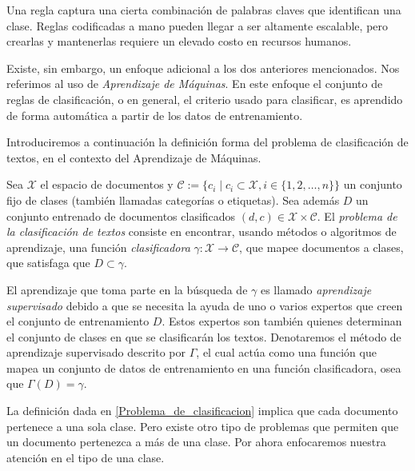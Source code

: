 \documentclass{llncs}
\begin{document}
	Una regla captura una cierta combinaci\'on de palabras claves que identifican una clase. Reglas codificadas a mano pueden llegar a ser altamente escalable, pero crearlas y mantenerlas requiere un elevado costo en recursos humanos.
	
	Existe, sin embargo, un enfoque adicional a los dos anteriores mencionados. Nos referimos al uso de \emph{Aprendizaje de M\'aquinas}. En este enfoque el conjunto de reglas de clasificaci\'on, o en general, el criterio usado para clasificar, es aprendido de forma autom\'atica a partir de los datos de entrenamiento.
	
	Introduciremos a continuaci\'on la definici\'on forma del problema de clasificaci\'on de textos, en el contexto del Aprendizaje de M\'aquinas.
	
	\begin{definition} \label{Problema_de_clasificacion}
		Sea $\mathcal{{X}}$ el espacio de documentos y $\mathcal{C} := \{c_i \mid c_i \subset \mathcal{X}, i \in \{ 1,2,\dots,n\} \}$ un conjunto fijo de clases (tambi\'en llamadas categor\'ias o etiquetas). Sea adem\'as $D$ un conjunto entrenado de documentos clasificados $(d,c) \in \mathcal X \times \mathcal{C}$. El \emph{problema de la clasificaci\'on de textos} consiste en encontrar, usando m\'etodos o algoritmos de aprendizaje, una funci\'on \emph{clasificadora} $\gamma : \mathcal{X} \rightarrow \mathcal{C}$, que mapee documentos a clases, que satisfaga que $D \subset \gamma$. 	

	\end{definition}
	
	El aprendizaje que toma parte en la b\'usqueda de $\gamma$ es llamado \emph{aprendizaje supervisado} debido a que se necesita la ayuda de uno o varios expertos que creen el conjunto de entrenamiento $D$. Estos expertos son  tambi\'en quienes determinan el conjunto de clases en que se clasificar\'an los textos. Denotaremos el m\'etodo de aprendizaje supervisado descrito por $\Gamma$, el cual act\'ua como una funci\'on que mapea un conjunto de datos de entrenamiento en una funci\'on clasificadora, osea que $\Gamma(D) = \gamma$.
	
	La definici\'on dada en \ref{Problema_de_clasificacion} implica que cada documento pertenece a una sola clase. Pero existe otro tipo de problemas que permiten que un documento pertenezca a m\'as de una clase. Por ahora enfocaremos nuestra atenci\'on en el tipo de una clase.
	
\end{document}
